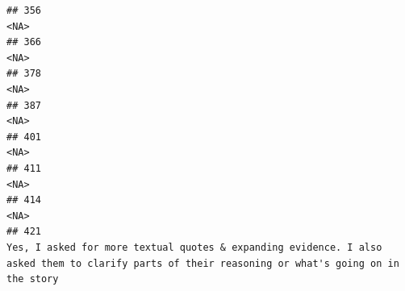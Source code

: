 \documentclass[
]{article}
\begin{document}
\begin{verbatim}
## 356                                                                                                                                                                                                                                                                                                                                                <NA>
## 366                                                                                                                                                                                                                                                                                                                                                <NA>
## 378                                                                                                                                                                                                                                                                                                                                                <NA>
## 387                                                                                                                                                                                                                                                                                                                                                <NA>
## 401                                                                                                                                                                                                                                                                                                                                                <NA>
## 411                                                                                                                                                                                                                                                                                                                                                <NA>
## 414                                                                                                                                                                                                                                                                                                                                                <NA>
## 421                                                                                                                                                                                                    Yes, I asked for more textual quotes & expanding evidence. I also asked them to clarify parts of their reasoning or what's going on in the story

\end{verbatim}
\end{document}
